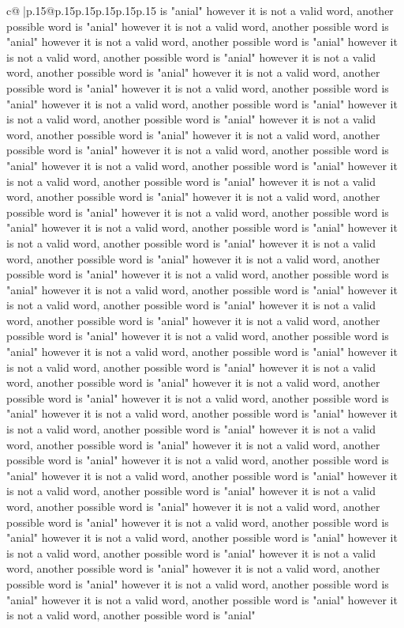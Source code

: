 \documentclass{article}
\begin{document}
{\begin{supertabular}{c@{$\;$}|p{.15\linewidth}@{}p{.15\linewidth}p{.15\linewidth}p{.15\linewidth}p{.15\linewidth}p{.15\linewidth}}
{{{is "anial" however it is not a valid word, another possible word is "anial" however it is not a valid word, another possible word is "anial" however it is not a valid word, another possible word is "anial" however it is not a valid word, another possible word is "anial" however it is not a valid word, another possible word is "anial" however it is not a valid word, another possible word is "anial" however it is not a valid word, another possible word is "anial" however it is not a valid word, another possible word is "anial" however it is not a valid word, another possible word is "anial" however it is not a valid word, another possible word is "anial" however it is not a valid word, another possible word is "anial" however it is not a valid word, another possible word is "anial" however it is not a valid word, another possible word is "anial" however it is not a valid word, another possible word is "anial" however it is not a valid word, another possible word is "anial" however it is not a valid word, another possible word is "anial" however it is not a valid word, another possible word is "anial" however it is not a valid word, another possible word is "anial" however it is not a valid word, another possible word is "anial" however it is not a valid word, another possible word is "anial" however it is not a valid word, another possible word is "anial" however it is not a valid word, another possible word is "anial" however it is not a valid word, another possible word is "anial" however it is not a valid word, another possible word is "anial" however it is not a valid word, another possible word is "anial" however it is not a valid word, another possible word is "anial" however it is not a valid word, another possible word is "anial" however it is not a valid word, another possible word is "anial" however it is not a valid word, another possible word is "anial" however it is not a valid word, another possible word is "anial" however it is not a valid word, another possible word is "anial" however it is not a valid word, another possible word is "anial" however it is not a valid word, another possible word is "anial" however it is not a valid word, another possible word is "anial" however it is not a valid word, another possible word is "anial" however it is not a valid word, another possible word is "anial" however it is not a valid word, another possible word is "anial" however it is not a valid word, another possible word is "anial" however it is not a valid word, another possible word is "anial" however it is not a valid word, another possible word is "anial" however it is not a valid word, another possible word is "anial" however it is not a valid word, another possible word is "anial" however it is not a valid word, another possible word is "anial" however it is not a valid word, another possible word is "anial" however it is not a valid word, another possible word is "anial" however it is not a valid word, another possible word is "anial" however it is not a valid word, another possible word is "anial" however it is not a valid word, another possible word is "anial" however it is not a valid word, another possible word is "anial" }}}
\end{supertabular}}
\end{document}
